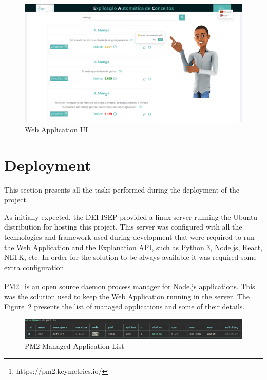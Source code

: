 \begin{figure}[H]
\centering
\includegraphics[width=\textwidth,keepaspectratio]{ch5/assets/webapp.png}
\caption[Web Application UI]{Web Application UI}
\label{fig:webApp}
\end{figure}

\section{Deployment}

This section presents all the tasks performed during the deployment of the project.

As initially expected, the DEI-ISEP provided a linux server running the Ubuntu distribution for hosting this project.
This server was configured with all the technologies and framework used during development that were required to run the Web Application and the Explanation API, such as Python 3, Node.js, React, NLTK, etc.
In order for the solution to be always available it was required some extra configuration.

PM2\footnote{https://pm2.keymetrics.io/} is an open source daemon process manager for Node.js applications.
This was the solution used to keep the Web Application running in the server.
The Figure~\ref{fig:pm2} presents the list of managed applications and some of their details.

\begin{figure}[H]
\centering
\includegraphics[width=\textwidth,keepaspectratio]{ch5/assets/pm2ls.png}
\caption[PM2 Managed Application List]{PM2 Managed Application List}
\label{fig:pm2}
\end{figure}

